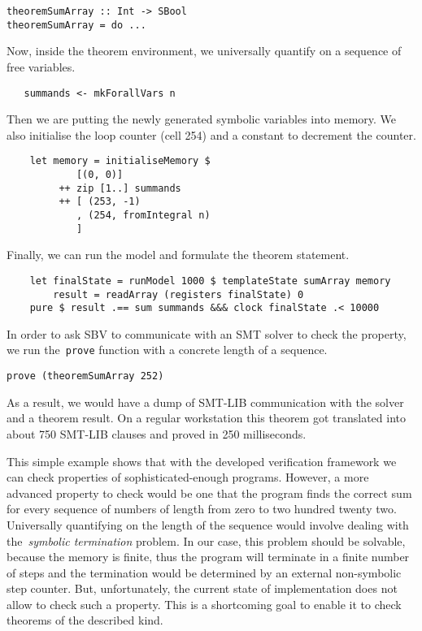 \begin{verbatim}
theoremSumArray :: Int -> SBool
theoremSumArray = do ...
\end{verbatim}

Now, inside the theorem environment, we universally quantify on a
sequence of free variables.

\begin{verbatim}
   summands <- mkForallVars n
\end{verbatim}

Then we are putting the newly generated symbolic variables into memory. We also
initialise the loop counter (cell 254) and a constant to decrement the counter.

\clearpage

\begin{verbatim}
    let memory = initialiseMemory $
            [(0, 0)]
         ++ zip [1..] summands
         ++ [ (253, -1)
            , (254, fromIntegral n)
            ]
\end{verbatim}

Finally, we can run the model and formulate the theorem statement.

\begin{verbatim}
    let finalState = runModel 1000 $ templateState sumArray memory
        result = readArray (registers finalState) 0
    pure $ result .== sum summands &&& clock finalState .< 10000
\end{verbatim}

In order to ask SBV to communicate with an SMT solver to check the property,
we run the~\texttt{prove} function with a concrete length of a sequence.

\begin{verbatim}
prove (theoremSumArray 252)
\end{verbatim}

As a result, we would have a dump of SMT-LIB communication with the solver and
a theorem result. On a regular workstation this theorem got translated into about
750 SMT-LIB clauses and proved in 250 milliseconds.

This simple example shows that with the developed verification framework we can
check properties of sophisticated-enough programs. However, a more advanced
property to check would be one that the program finds the correct sum for every
sequence of numbers of length from zero to two hundred twenty two. Universally
quantifying on the length of the sequence would involve dealing with
the~\emph{symbolic termination} problem. In our case, this problem should be solvable,
because the memory is finite, thus the program will terminate in a finite number of
steps and the termination would be determined by an external non-symbolic step counter.
But, unfortunately, the current state of implementation does not allow to check such a
property. This is a shortcoming goal to enable it to check theorems of the described kind.